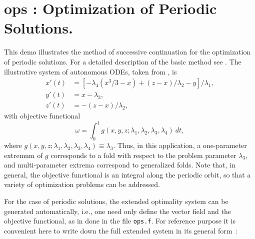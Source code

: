 \documentclass[12pt]{report}
\begin{document}
\section{ ops : Optimization of Periodic Solutions.} \label{sec:Demos_ops}
This demo illustrates the method of successive continuation
for the optimization of periodic solutions.
For a detailed description of the basic method see
 \citeyear{DoKeKe:91b}.
The illustrative system of autonomous ODEs, taken from 
 \citeyear{Alej:91}, is
\begin{equation} \begin{array}{cl}
  x'(t) & = [-\lambda_4(x^3/3-x) + (z-x)/\lambda_2 - y]/\lambda_1, \\
  y'(t) &= x-\lambda_3, \\
  z'(t) &= -(z-x)/\lambda_2,
\end{array} \end{equation}
with objective functional
$$ \omega = 
  \int_0^{1} g(x,y,z;\lambda_1,\lambda_2,\lambda_3,\lambda_4) ~ dt, $$
where $g(x,y,z;\lambda_1,\lambda_2,\lambda_3,\lambda_4) \equiv \lambda_3$.
Thus, in this application, a one-parameter extremum of $g$ corresponds
to a fold with respect to the problem parameter $\lambda_3$, 
and multi-parameter extrema correspond to generalized folds.
Note that, in general, the objective functional is an integral along 
the periodic orbit, so that a variety of optimization problems
can be addressed.

For the case of periodic solutions, the extended optimality system
can be generated automatically, i.e., one need only define the vector field 
and the objective functional, as in done in the file {\tt ops.f}.
For reference purpose it is convenient here to write down
the full extended system in its general form~:
\end{document}
